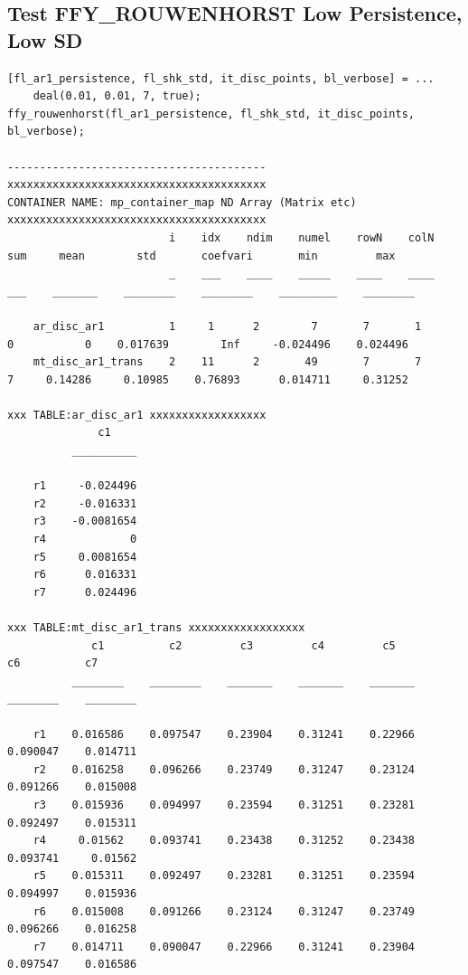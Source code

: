 \documentclass[
]{book}
\begin{document}
\hypertarget{test-ffy_rouwenhorst-low-persistence-low-sd-1}{%
\subsection{Test FFY\_ROUWENHORST Low Persistence, Low SD}\label{test-ffy_rouwenhorst-low-persistence-low-sd-1}}

\begin{verbatim}
[fl_ar1_persistence, fl_shk_std, it_disc_points, bl_verbose] = ...
    deal(0.01, 0.01, 7, true);
ffy_rouwenhorst(fl_ar1_persistence, fl_shk_std, it_disc_points, bl_verbose);

----------------------------------------
xxxxxxxxxxxxxxxxxxxxxxxxxxxxxxxxxxxxxxxx
CONTAINER NAME: mp_container_map ND Array (Matrix etc)
xxxxxxxxxxxxxxxxxxxxxxxxxxxxxxxxxxxxxxxx
                         i    idx    ndim    numel    rowN    colN    sum     mean        std       coefvari       min         max   
                         _    ___    ____    _____    ____    ____    ___    _______    ________    ________    _________    ________

    ar_disc_ar1          1     1      2        7       7       1       0           0    0.017639        Inf     -0.024496    0.024496
    mt_disc_ar1_trans    2    11      2       49       7       7       7     0.14286     0.10985    0.76893      0.014711     0.31252

xxx TABLE:ar_disc_ar1 xxxxxxxxxxxxxxxxxx
              c1    
          __________

    r1     -0.024496
    r2     -0.016331
    r3    -0.0081654
    r4             0
    r5     0.0081654
    r6      0.016331
    r7      0.024496

xxx TABLE:mt_disc_ar1_trans xxxxxxxxxxxxxxxxxx
             c1          c2         c3         c4         c5          c6          c7   
          ________    ________    _______    _______    _______    ________    ________

    r1    0.016586    0.097547    0.23904    0.31241    0.22966    0.090047    0.014711
    r2    0.016258    0.096266    0.23749    0.31247    0.23124    0.091266    0.015008
    r3    0.015936    0.094997    0.23594    0.31251    0.23281    0.092497    0.015311
    r4     0.01562    0.093741    0.23438    0.31252    0.23438    0.093741     0.01562
    r5    0.015311    0.092497    0.23281    0.31251    0.23594    0.094997    0.015936
    r6    0.015008    0.091266    0.23124    0.31247    0.23749    0.096266    0.016258
    r7    0.014711    0.090047    0.22966    0.31241    0.23904    0.097547    0.016586


\end{verbatim}
\end{document}
